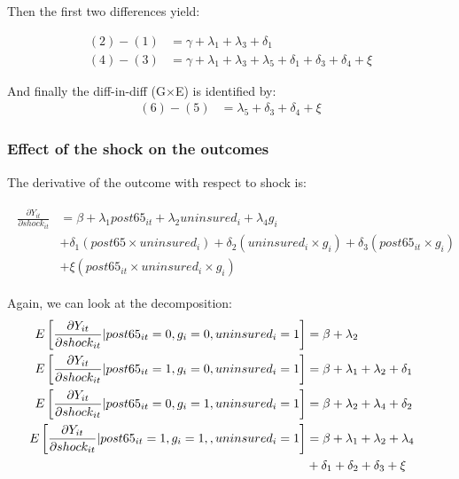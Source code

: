 \documentclass[10pt,compress,xcolor=dvipsnames]{beamer}    %
\newcommand{\1}[1]{\mathrm{1\hspace*{-2.5pt}l}[#1]}	%
\begin{document}
\begin{frame}
\begin{footnotesize}
Then the first two differences yield:

\begin{align}
(2)-(1)&=\gamma+\lambda_1+\lambda_3+\delta_1\\
(4)-(3)&=\gamma+\lambda_1+\lambda_3+\lambda_5+\delta_1+\delta_3+\delta_4+\xi
\end{align}

And finally the diff-in-diff (G$\times$E) is identified by:
\begin{align}
	(6)-(5)&=\lambda_5+\delta_3+\delta_4+\xi
\end{align}
\end{footnotesize}

\end{frame}

\begin{frame}
\frametitle{Effect of the shock on the outcomes} \label{frame:shockmath}
The derivative of the outcome with respect to shock is:
\hyperlink{fig:maincoeffplot}{}

\begin{footnotesize}
\begin{align}
\begin{aligned}
	\frac{\partial Y_{it}}{\partial shock_{it}}&=\beta+\lambda_1post65_{it}+\lambda_2uninsured_{i}+\lambda_4g_i\\
	&+\delta_1(post65 \times uninsured_i)+\delta_2(uninsured_i \times g_i)+\delta_3(post65_{it} \times g_i)\\
	&+\xi(post65_{it} \times uninsured_i \times g_i)
\end{aligned}
\end{align}

Again, we can look at the decomposition:
\begin{align}
\phantom{E\left[ \frac{\partial Y_{it}}{\partial shock_{it}}| post65_{it}=1, g_i=1,uninsured_i=1\right]}
&\begin{aligned}
\mathllap{E\left[ \frac{\partial Y_{it}}{\partial shock_{it}}| post65_{it}=0, g_i=0,uninsured_i=1\right]} &=\beta+\lambda_2
\end{aligned}\\
&\begin{aligned}
\mathllap{E\left[ \frac{\partial Y_{it}}{\partial shock_{it}}| post65_{it}=1, g_i=0,uninsured_i=1\right]} &=\beta+\lambda_1+\lambda_2+\delta_1
\end{aligned}\\
&\begin{aligned}
\mathllap{E\left[ \frac{\partial Y_{it}}{\partial shock_{it}}| post65_{it}=0, g_i=1,uninsured_i=1\right]} &=\beta+\lambda_2+\lambda_4+\delta_2
\end{aligned}\\
&\begin{aligned}
\mathllap{E\left[ \frac{\partial Y_{it}}{\partial shock_{it}}| post65_{it}=1, g_i=1,,uninsured_i=1\right]} &=\beta+\lambda_1+\lambda_2+\lambda_4\\
&+\delta_1+\delta_2+\delta_3+\xi
\end{aligned}
\end{align}


\end{footnotesize}
\end{frame}
\end{document}
